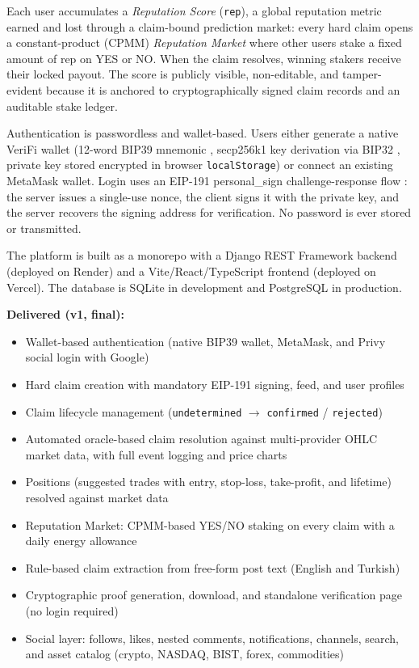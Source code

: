 \documentclass[a4paper,12pt]{report}
\begin{document}
Each user accumulates a \textit{Reputation Score} (\texttt{rep}), a global reputation metric earned and lost through a claim-bound prediction market: every hard claim opens a constant-product (CPMM) \textit{Reputation Market} where other users stake a fixed amount of rep on YES or NO. When the claim resolves, winning stakers receive their locked payout. The score is publicly visible, non-editable, and tamper-evident because it is anchored to cryptographically signed claim records and an auditable stake ledger.

Authentication is passwordless and wallet-based. Users either generate a native VeriFi wallet (12-word BIP39 mnemonic \cite{bip39}, secp256k1 key derivation via BIP32 \cite{bip32}, private key stored encrypted in browser \texttt{localStorage}) or connect an existing MetaMask wallet. Login uses an EIP-191 personal\_sign challenge-response flow \cite{eip191}: the server issues a single-use nonce, the client signs it with the private key, and the server recovers the signing address for verification. No password is ever stored or transmitted.

The platform is built as a monorepo with a Django REST Framework backend (deployed on Render) and a Vite/React/TypeScript frontend (deployed on Vercel). The database is SQLite in development and PostgreSQL in production.

\textbf{Delivered (v1, final):}
\begin{itemize}
    \item Wallet-based authentication (native BIP39 wallet, MetaMask, and Privy social login with Google)
    \item Hard claim creation with mandatory EIP-191 signing, feed, and user profiles
    \item Claim lifecycle management (\texttt{undetermined} $\rightarrow$ \texttt{confirmed} / \texttt{rejected})
    \item Automated oracle-based claim resolution against multi-provider OHLC market data, with full event logging and price charts
    \item Positions (suggested trades with entry, stop-loss, take-profit, and lifetime) resolved against market data
    \item Reputation Market: CPMM-based YES/NO staking on every claim with a daily energy allowance
    \item Rule-based claim extraction from free-form post text (English and Turkish)
    \item Cryptographic proof generation, download, and standalone verification page (no login required)
    \item Social layer: follows, likes, nested comments, notifications, channels, search, and asset catalog (crypto, NASDAQ, BIST, forex, commodities)
\end{itemize}
\end{document}
